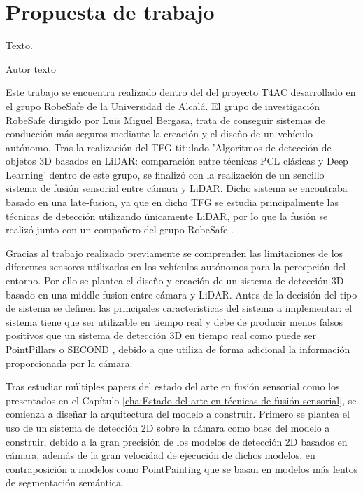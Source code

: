 \chapter{Propuesta de trabajo}
\label{cha:Propuesta de trabajo}

\begin{FraseCelebre}
  \begin{Frase}
    Texto.
  \end{Frase}
  \begin{Fuente}
    Autor texto
  \end{Fuente}
\end{FraseCelebre}

\noindent
Este trabajo se encuentra realizado dentro del del proyecto \ac{T4AC} desarrollado en el grupo RobeSafe de la Universidad de Alcalá. El grupo de investigación RobeSafe dirigido por Luis Miguel Bergasa, trata de conseguir sistemas de conducción más seguros mediante la creación y el diseño de un vehículo autónomo. Tras la realización del \ac{TFG} titulado 'Algoritmos de detección de objetos 3D basados en LiDAR: comparación entre técnicas PCL clásicas y Deep Learning' \cite{tfg_javi} dentro de este grupo, se finalizó con la realización de un sencillo sistema de fusión sensorial entre cámara y \ac{LiDAR}. Dicho sistema se encontraba basado en una late-fusion, ya que en dicho \ac{TFG} se estudia principalmente las técnicas de detección utilizando únicamente \ac{LiDAR}, por lo que la fusión se realizó junto con un compañero del grupo RobeSafe \cite{tfg_miguel}.

Gracias al trabajo realizado previamente se comprenden las limitaciones de los diferentes sensores utilizados en los vehículos autónomos para la percepción del entorno. Por ello se plantea el diseño y creación de un sistema de detección 3D basado en una middle-fusion entre cámara y \ac{LiDAR}. Antes de la decisión del tipo de sistema se definen las principales características del sistema a implementar: el sistema tiene que ser utilizable en tiempo real y debe de producir menos falsos positivos que un sistema de detección 3D en tiempo real como puede ser PointPillars \cite{PointPillars} o SECOND \cite{SECOND}, debido a que utiliza de forma adicional la información proporcionada por la cámara.

Tras estudiar múltiples papers del estado del arte en fusión sensorial como los presentados en el Capítulo \ref{cha:Estado del arte en técnicas de fusión sensorial}, se comienza a diseñar la arquitectura del modelo a construir. Primero se plantea el uso de un sistema de detección 2D sobre la cámara como base del modelo a construir, debido a la gran precisión de los modelos de detección 2D basados en cámara, además de la gran velocidad de ejecución de dichos modelos, en contraposición a modelos como PointPainting \cite{PointPainting} que se basan en modelos más lentos de segmentación semántica.

